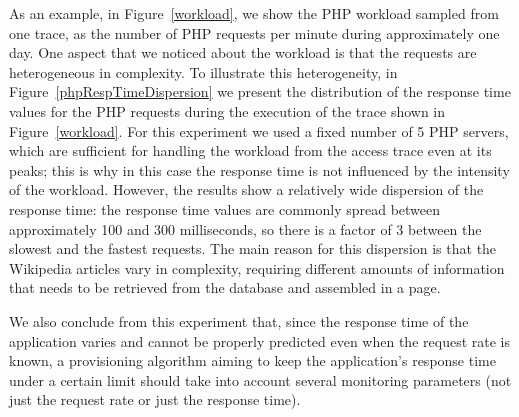 As an example, in Figure~\ref{workload}, we show the PHP workload
sampled from one trace, as the number of PHP requests per minute
during approximately one day. One aspect that we noticed about the
workload is that the requests are heterogeneous in complexity.  To
illustrate this heterogeneity, in Figure~\ref{phpRespTimeDispersion}
we present the distribution of the response time values for the PHP
requests during the execution of the trace shown in
Figure~\ref{workload}.  For this experiment we used a fixed number of
5 PHP servers, which are sufficient for handling the workload from the
access trace even at its peaks; this is why in this case the response
time is not influenced by the intensity of the workload.  However, the
results show a relatively wide dispersion of the response time: the
response time values are commonly spread between approximately 100 and
300 milliseconds, so there is a factor of 3 between the slowest and
the fastest requests.  The main reason for this dispersion is that the
Wikipedia articles vary in complexity, requiring different amounts of
information that needs to be retrieved from the database and assembled
in a page.


We also conclude from this experiment that, since the response time of
the application varies and cannot be properly predicted even when the
request rate is known, a provisioning algorithm aiming to keep the
application's response time under a certain limit should take into
account several monitoring parameters (not just the request rate or
just the response time).








